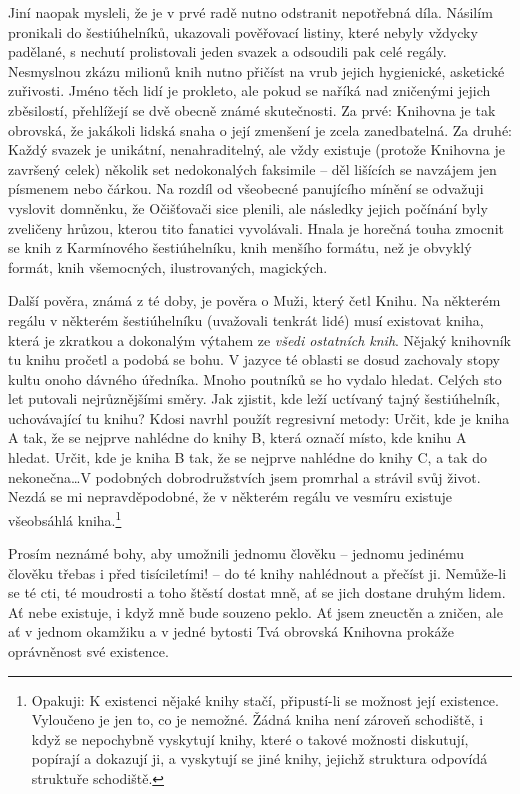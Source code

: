 \documentclass[11pt]{article}
\begin{document}
Jiní naopak mysleli, že je v prvé radě nutno odstranit nepotřebná díla. Násilím pronikali do šestiúhelníků, ukazovali pověřovací listiny, které nebyly vždycky padělané, s nechutí prolistovali jeden svazek a odsoudili pak celé regály. Nesmyslnou zkázu milionů knih nutno přičíst na vrub jejich hygienické, asketické zuřivosti. Jméno těch lidí je prokleto, ale pokud se naříká nad  zničenými jejich zběsilostí, přehlížejí se dvě obecně známé skutečnosti. Za prvé: Knihovna je tak obrovská, že jakákoli lidská snaha o její zmenšení je zcela zanedbatelná. Za druhé: Každý svazek je unikátní, nenahraditelný, ale vždy existuje (protože Knihovna je završený celek) několik set nedokonalých faksimile -- děl lišících se navzájem jen písmenem nebo čárkou. Na rozdíl od všeobecné panujícího mínění se odvažuji vyslovit domněnku, že Očišťovači sice plenili, ale následky jejich počínání byly zveličeny hrůzou, kterou tito fanatici vyvolávali. Hnala je horečná touha zmocnit se knih z Karmínového šestiúhelníku, knih menšího formátu, než je obvyklý formát, knih všemocných, ilustrovaných, magických.

Další pověra, známá z té doby, je pověra o Muži, který četl Knihu. Na některém regálu v některém šestiúhelníku (uvažovali tenkrát lidé) musí existovat kniha, která je zkratkou a dokonalým výtahem ze \textit{všedi ostatních knih}. Nějaký knihovník tu knihu pročetl a podobá se bohu. V jazyce té oblasti se dosud zachovaly stopy kultu onoho dávného úředníka. Mnoho poutníků se ho vydalo hledat. Celých sto let putovali nejrůznějšími směry. Jak zjistit, kde leží uctívaný tajný šestiúhelník, uchovávající tu knihu? Kdosi navrhl použít regresivní metody: Určit, kde je kniha A tak, že se nejprve nahlédne do knihy B, která označí místo, kde knihu A hledat. Určit, kde je kniha B tak, že se nejprve nahlédne do knihy C, a tak do nekonečna\dots V podobných dobrodružstvích jsem promrhal a strávil svůj život. Nezdá se mi nepravděpodobné, že v některém regálu ve vesmíru existuje všeobsáhlá kniha.\footnote{Opakuji: K existenci nějaké knihy stačí, připustí-li se možnost její existence. Vyloučeno je jen to, co je nemožné. Žádná kniha není zároveň schodiště, i když se nepochybně vyskytují knihy, které o takové možnosti diskutují, popírají a dokazují ji, a vyskytují se jiné knihy, jejichž struktura odpovídá struktuře schodiště.}

Prosím neznámé bohy, aby umožnili jednomu člověku -- jednomu jedinému člověku třebas i před tisíciletími! -- do té knihy nahlédnout a přečíst ji. Nemůže-li se té cti, té moudrosti a toho štěstí dostat mně, ať se jich dostane druhým lidem. Ať nebe existuje, i když mně bude souzeno peklo. Ať jsem zneuctěn a zničen, ale ať v jednom okamžiku a v jedné bytosti Tvá obrovská Knihovna prokáže oprávněnost své existence.
\end{document}
